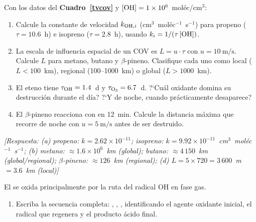 \begin{bloque_ejercicios}
\begin{ejercicios}
\item Con los datos del \textbf{Cuadro~\ref{tvcov}}
y $[\ce{OH}] = 1\times10^6$~mol\'ec/cm$^3$:

\begin{enumerate}[label=\alph*)]
    \item Calcule la constante de velocidad $k_{\ce{OH},i}$
          (cm$^3$~mol\'ec$^{-1}$~s$^{-1}$) para propeno
          ($\tau=10.6$~h) e isopreno ($\tau=2.8$~h),
          usando $k_i = 1/(\tau\,[\ce{OH}])$.

    \item La escala de influencia espacial de un COV es
          $L = u\cdot\tau$ con $u = \SI{10}{\metre\per\second}$.
          Calcule $L$ para metano, butano y $\beta$-pineno.
          Clasifique cada uno como local ($L<100$~km),
          regional (100--1000~km) o global ($L>1000$~km).

    \item El eteno tiene $\tau_{\ce{OH}} = 1.4$~d y
          $\tau_{\ce{O3}} = 6.7$~d.
          ?`Cu\'al oxidante domina su destrucci\'on durante
          el d\'ia? ?`Y de noche, cuando 
          pr\'acticamente desaparece?

    \item El $\beta$-pineno reacciona con  en 12~min.
          Calcule la distancia m\'axima que recorre
          de noche con $u = \SI{5}{\metre\per\second}$
          antes de ser destruido.
\end{enumerate}

\textit{[Respuesta:
(a) propeno: $k = 2.62\times10^{-11}$;
    isopreno: $k = 9.92\times10^{-11}$~cm$^3$~mol\'ec$^{-1}$~s$^{-1}$;
(b) metano: $\approx 1.6\times10^6$~km (global);
    butano: $\approx 4\,150$~km (global/regional);
    $\beta$-pineno: $\approx 126$~km (regional);
(d) $L = 5\times720 = 3\,600$~m $= 3.6$~km (local)]}

\item El  se oxida principalmente por la ruta
del radical OH en fase gas.

\begin{enumerate}[label=\alph*)]
    \item Escriba la secuencia completa:
          ,
          ,
          ,
          identificando el agente oxidante inicial,
          el radical que regenera 
          y el producto \'acido final.


\end{enumerate}
\end{ejercicios}
\end{bloque_ejercicios}

